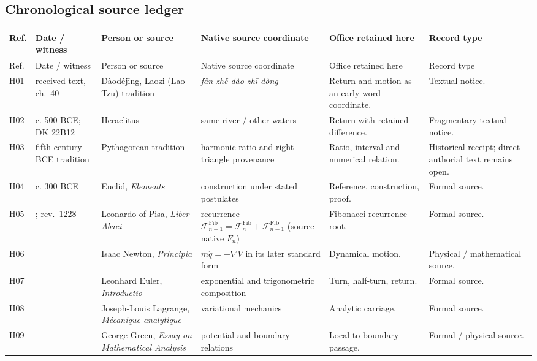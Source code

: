 \documentclass[11pt,a4paper]{article}
\newcommand{\zh}[2]{\textit{#2}}}}}}
\newcommand{\Fib}[1]{\mathcal{F}^{\mathrm{Fib}}_{#1}}\newcommand{\Luc}[1]{\mathcal{L}^{\mathrm{Luc}}_{#1}}
\theoremstyle{plain}
\theoremstyle{definition}
\theoremstyle{remark}
\begin{document}
\subsection{Chronological source ledger}
{\footnotesize\setlength{\tabcolsep}{3pt}
\begin{longtable}{@{}>{\raggedright\arraybackslash}p{0.8cm}>{\raggedright\arraybackslash}p{1.7cm}>{\raggedright\arraybackslash}p{3.3cm}>{\raggedright\arraybackslash}p{3.4cm}>{\raggedright\arraybackslash}p{3.3cm}>{\raggedright\arraybackslash}p{2.1cm}@{}}
\toprule
Ref. & Date / witness & Person or source & Native source coordinate & Office retained here & Record type\\\midrule\endfirsthead
\toprule
Ref. & Date / witness & Person or source & Native source coordinate & Office retained here & Record type\\\midrule\endhead
\bottomrule\endfoot
H01 & received text, ch.~40 & D\`aod\'ej\={\i}ng, Laozi (Lao Tzu) tradition & \zh{反者道之動}{fǎn zhě dào zhī dòng} & Return and motion as an early word-coordinate. & Textual notice.\\
H02 & c. 500 BCE; DK 22B12 & Heraclitus & same river / other waters & Return with retained difference. & Fragmentary textual notice.\\
H03 & fifth-century BCE tradition & Pythagorean tradition & harmonic ratio and right-triangle provenance & Ratio, interval and numerical relation. & Historical receipt; direct authorial text remains open.\\
H04 & c. 300 BCE & Euclid, \emph{Elements} & construction under stated postulates & Reference, construction, proof. & Formal source.\\
H05 & 1202; rev.\ 1228 & Leonardo of Pisa, \emph{Liber Abaci} & recurrence $\Fib{n+1}=\Fib n+\Fib{n-1}$ (source-native $F_n$) & Fibonacci recurrence root. & Formal source.\\
H06 & 1687 & Isaac Newton, \emph{Principia} & $m\ddot q=-\nabla V$ in its later standard form & Dynamical motion. & Physical / mathematical source.\\
H07 & 1748 & Leonhard Euler, \emph{Introductio} & exponential and trigonometric composition & Turn, half-turn, return. & Formal source.\\
H08 & 1788 & Joseph-Louis Lagrange, \emph{M\'ecanique analytique} & variational mechanics & Analytic carriage. & Formal source.\\
H09 & 1828 & George Green, \emph{Essay on Mathematical Analysis} & potential and boundary relations & Local-to-boundary passage. & Formal / physical source.\\

\end{longtable}}
\end{document}
